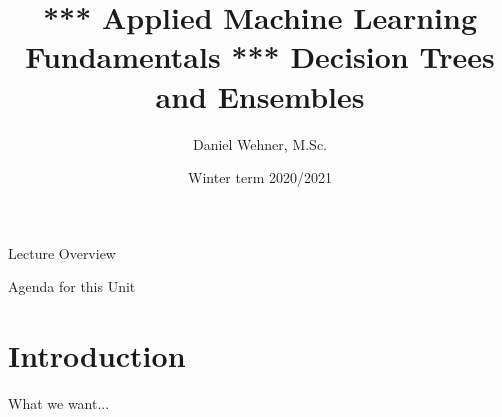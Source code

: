 


\title[Decision Trees and Ensembles]{*** Applied Machine Learning Fundamentals *** Decision Trees and Ensembles}
\author{Daniel Wehner, M.Sc.}
\date{Winter term 2020/2021}




\maketitlepage


\begin{frame}{Lecture Overview}{}
\end{frame}


\begin{frame}{Agenda for this Unit}
	\begin{multicols}{2}
		\tableofcontents
	\end{multicols}
\end{frame}


\section{Introduction}

\begin{frame}{What we want...}{}
\end{frame}


